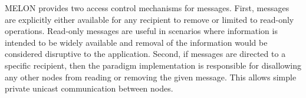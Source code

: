 \documentclass[lnicst]{svmultln}
\begin{document}
MELON provides two access control mechanisms for messages. First, messages are explicitly either available for any recipient to remove or limited to read-only operations. Read-only messages are useful in scenarios where information is intended to be widely available and removal of the information would be considered disruptive to the application. Second, if messages are directed to a specific recipient, then the paradigm implementation is responsible for disallowing any other nodes from reading or removing the given message. This allows simple private unicast communication between nodes.

%
%
%
%
\end{document}
